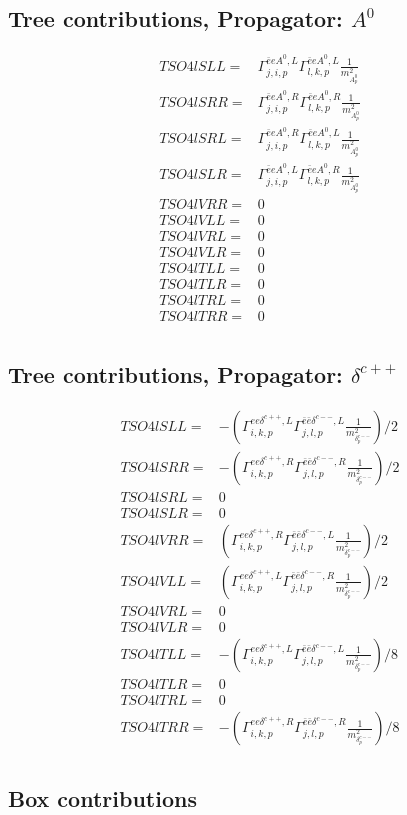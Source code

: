 \documentclass[A4,landscape]{article}
\begin{document}
\subsection{Tree contributions, Propagator: $A^0$} 

\begin{align} 
  TSO4lSLL= & \Gamma^{\bar{e}e A^0 ,L}_{j, i, p} \Gamma^{\bar{e}e A^0 ,L}_{l, k, p} \frac{1}{m^2_{A^0_{{p}}}} \\ 
  TSO4lSRR= & \Gamma^{\bar{e}e A^0 ,R}_{j, i, p} \Gamma^{\bar{e}e A^0 ,R}_{l, k, p} \frac{1}{m^2_{A^0_{{p}}}} \\ 
  TSO4lSRL= & \Gamma^{\bar{e}e A^0 ,R}_{j, i, p} \Gamma^{\bar{e}e A^0 ,L}_{l, k, p} \frac{1}{m^2_{A^0_{{p}}}} \\ 
  TSO4lSLR= & \Gamma^{\bar{e}e A^0 ,L}_{j, i, p} \Gamma^{\bar{e}e A^0 ,R}_{l, k, p} \frac{1}{m^2_{A^0_{{p}}}} \\ 
  TSO4lVRR= & 0 \\ 
  TSO4lVLL= & 0 \\ 
  TSO4lVRL= & 0 \\ 
  TSO4lVLR= & 0 \\ 
  TSO4lTLL= & 0 \\ 
  TSO4lTLR= & 0 \\ 
  TSO4lTRL= & 0 \\ 
  TSO4lTRR= & 0 \\ 
\end{align} 
\subsection{Tree contributions, Propagator: $\delta^{c++}$} 

\begin{align} 
  TSO4lSLL= & -(\Gamma^{e e \delta^{c++},L}_{i, k, p} \Gamma^{\bar{e}\bar{e}\delta^{c--} ,L}_{j, l, p} \frac{1}{m^2_{\delta^{c--}_{{p}}}})/2 \\ 
  TSO4lSRR= & -(\Gamma^{e e \delta^{c++},R}_{i, k, p} \Gamma^{\bar{e}\bar{e}\delta^{c--} ,R}_{j, l, p} \frac{1}{m^2_{\delta^{c--}_{{p}}}})/2 \\ 
  TSO4lSRL= & 0 \\ 
  TSO4lSLR= & 0 \\ 
  TSO4lVRR= & (\Gamma^{e e \delta^{c++},R}_{i, k, p} \Gamma^{\bar{e}\bar{e}\delta^{c--} ,L}_{j, l, p} \frac{1}{m^2_{\delta^{c--}_{{p}}}})/2 \\ 
  TSO4lVLL= & (\Gamma^{e e \delta^{c++},L}_{i, k, p} \Gamma^{\bar{e}\bar{e}\delta^{c--} ,R}_{j, l, p} \frac{1}{m^2_{\delta^{c--}_{{p}}}})/2 \\ 
  TSO4lVRL= & 0 \\ 
  TSO4lVLR= & 0 \\ 
  TSO4lTLL= & -(\Gamma^{e e \delta^{c++},L}_{i, k, p} \Gamma^{\bar{e}\bar{e}\delta^{c--} ,L}_{j, l, p} \frac{1}{m^2_{\delta^{c--}_{{p}}}})/8 \\ 
  TSO4lTLR= & 0 \\ 
  TSO4lTRL= & 0 \\ 
  TSO4lTRR= & -(\Gamma^{e e \delta^{c++},R}_{i, k, p} \Gamma^{\bar{e}\bar{e}\delta^{c--} ,R}_{j, l, p} \frac{1}{m^2_{\delta^{c--}_{{p}}}})/8 \\ 
\end{align} 
\subsection{Box contributions} 
\end{document}
